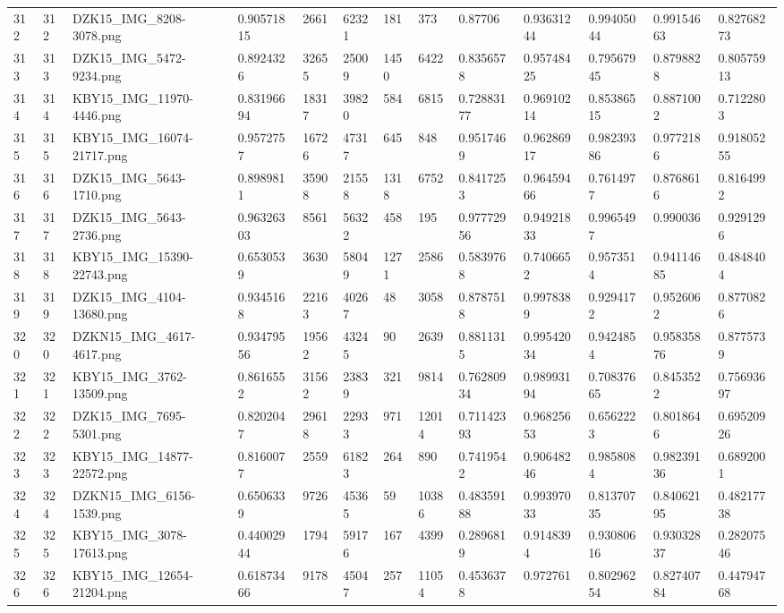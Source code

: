 \documentclass[11pt, a4paper, twoside]{report}
\begin{document}
\begin{longtable}[c]{@{}lllllllllllll@{}}
312 & 312 & DZK15\_IMG\_8208-3078.png & 0.90571815 & 2661 & 62321 & 181 & 373 & 0.87706 & 0.93631244 & 0.99405044 & 0.99154663 & 0.82768273 \\
313 & 313 & DZK15\_IMG\_5472-9234.png & 0.8924326 & 32655 & 25009 & 1450 & 6422 & 0.8356578 & 0.95748425 & 0.79567945 & 0.8798828 & 0.80575913 \\
314 & 314 & KBY15\_IMG\_11970-4446.png & 0.83196694 & 18317 & 39820 & 584 & 6815 & 0.72883177 & 0.96910214 & 0.85386515 & 0.8871002 & 0.7122803 \\
315 & 315 & KBY15\_IMG\_16074-21717.png & 0.9572757 & 16726 & 47317 & 645 & 848 & 0.9517469 & 0.96286917 & 0.98239386 & 0.9772186 & 0.91805255 \\
316 & 316 & DZK15\_IMG\_5643-1710.png & 0.8989811 & 35908 & 21558 & 1318 & 6752 & 0.8417253 & 0.96459466 & 0.7614977 & 0.8768616 & 0.8164992 \\
317 & 317 & DZK15\_IMG\_5643-2736.png & 0.96326303 & 8561 & 56322 & 458 & 195 & 0.97772956 & 0.94921833 & 0.9965497 & 0.990036 & 0.9291296 \\
318 & 318 & KBY15\_IMG\_15390-22743.png & 0.6530539 & 3630 & 58049 & 1271 & 2586 & 0.5839768 & 0.7406652 & 0.9573514 & 0.94114685 & 0.4848404 \\
319 & 319 & DZK15\_IMG\_4104-13680.png & 0.9345168 & 22163 & 40267 & 48 & 3058 & 0.8787518 & 0.9978389 & 0.9294172 & 0.9526062 & 0.8770826 \\
320 & 320 & DZKN15\_IMG\_4617-4617.png & 0.93479556 & 19562 & 43245 & 90 & 2639 & 0.8811315 & 0.99542034 & 0.9424854 & 0.95835876 & 0.8775739 \\
321 & 321 & KBY15\_IMG\_3762-13509.png & 0.8616552 & 31562 & 23839 & 321 & 9814 & 0.76280934 & 0.98993194 & 0.70837665 & 0.8453522 & 0.75693697 \\
322 & 322 & DZK15\_IMG\_7695-5301.png & 0.8202047 & 29618 & 22933 & 971 & 12014 & 0.71142393 & 0.96825653 & 0.6562223 & 0.8018646 & 0.69520926 \\
323 & 323 & KBY15\_IMG\_14877-22572.png & 0.8160077 & 2559 & 61823 & 264 & 890 & 0.7419542 & 0.90648246 & 0.9858084 & 0.98239136 & 0.6892001 \\
324 & 324 & DZKN15\_IMG\_6156-1539.png & 0.6506339 & 9726 & 45365 & 59 & 10386 & 0.48359188 & 0.99397033 & 0.81370735 & 0.84062195 & 0.48217738 \\
325 & 325 & KBY15\_IMG\_3078-17613.png & 0.44002944 & 1794 & 59176 & 167 & 4399 & 0.2896819 & 0.9148394 & 0.93080616 & 0.93032837 & 0.28207546 \\
326 & 326 & KBY15\_IMG\_12654-21204.png & 0.61873466 & 9178 & 45047 & 257 & 11054 & 0.4536378 & 0.972761 & 0.80296254 & 0.82740784 & 0.44794768 \\

\end{longtable}
\end{document}

